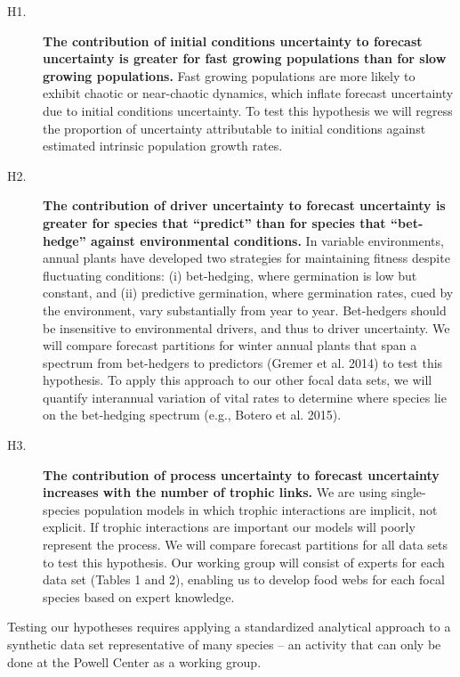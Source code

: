 \documentclass[12pt,]{article}
\begin{document}
\begin{description}

\item[H1.] \textbf{The contribution of initial conditions uncertainty to forecast uncertainty is greater for fast growing populations than for slow growing populations.} Fast growing populations are more likely to exhibit chaotic or near-chaotic dynamics, which inflate forecast uncertainty due to initial conditions uncertainty. To test this hypothesis we will regress the proportion of uncertainty attributable to initial conditions against estimated intrinsic population growth rates.

\item[H2.] \textbf{The contribution of driver uncertainty to forecast uncertainty is greater for species that ``predict'' than for species that ``bet-hedge'' against environmental conditions.} In variable environments, annual plants have developed two strategies for maintaining fitness despite fluctuating conditions: (i) bet-hedging, where germination is low but constant, and (ii) predictive germination, where germination rates, cued by the environment, vary substantially from year to year. Bet-hedgers should be insensitive to environmental drivers, and thus to driver uncertainty. We will compare forecast partitions for winter annual plants that span a spectrum from bet-hedgers to predictors (Gremer et al. 2014) to test this hypothesis. To apply this approach to our other focal data sets, we will quantify interannual variation of vital rates to determine where species lie on the bet-hedging spectrum (e.g., Botero et al. 2015).

\item[H3.] \textbf{The contribution of process uncertainty to forecast uncertainty increases with the number of trophic links.} We are using single-species population models in which trophic interactions are implicit, not explicit. If trophic interactions are important our models will poorly represent the process. We will compare forecast partitions for all data sets to test this hypothesis. Our working group will consist of experts for each data set (Tables 1 and 2), enabling us to develop food webs for each focal species based on expert knowledge. 

\end{description}

Testing our hypotheses requires applying a standardized analytical
approach to a synthetic data set representative of many species -- an
activity that can only be done at the Powell Center as a working group.
\end{document}
